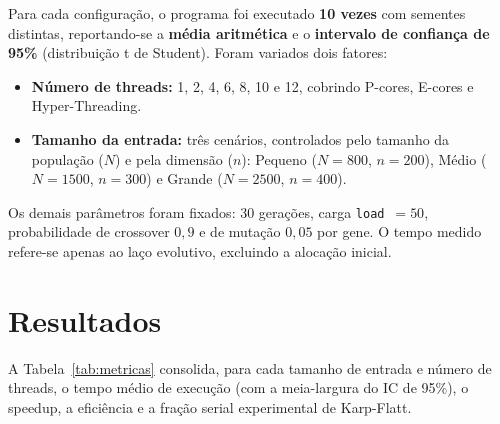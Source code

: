 \documentclass[12pt]{article}
\begin{document}
Para cada configuração, o programa foi executado \textbf{10 vezes} com
sementes distintas, reportando-se a \textbf{média aritmética} e o
\textbf{intervalo de confiança de 95\%} (distribuição t de Student). Foram
variados dois fatores:
\begin{itemize}
  \item \textbf{Número de threads:} 1, 2, 4, 6, 8, 10 e 12, cobrindo P-cores,
    E-cores e Hyper-Threading.
  \item \textbf{Tamanho da entrada:} três cenários, controlados pelo tamanho da
    população ($N$) e pela dimensão ($n$): Pequeno ($N{=}800$, $n{=}200$),
    Médio ($N{=}1500$, $n{=}300$) e Grande ($N{=}2500$, $n{=}400$).
\end{itemize}
Os demais parâmetros foram fixados: 30 gerações, carga \texttt{load}~$=50$,
probabilidade de crossover $0{,}9$ e de mutação $0{,}05$ por gene. O tempo
medido refere-se apenas ao laço evolutivo, excluindo a alocação inicial.

\section{Resultados}

A Tabela~\ref{tab:metricas} consolida, para cada tamanho de entrada e número
de threads, o tempo médio de execução (com a meia-largura do IC de 95\%), o
speedup, a eficiência e a fração serial experimental de Karp-Flatt.
\end{document}
